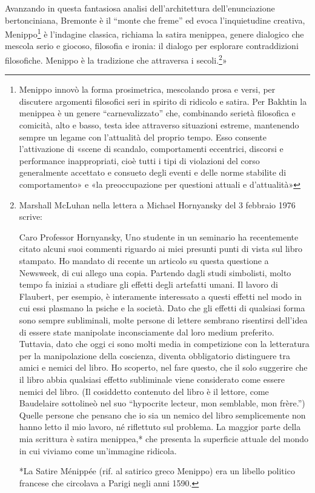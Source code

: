 Avanzando in questa fantasiosa analisi dell'architettura dell'enunciazione
bertonciniana, Bremonte è il “monte che freme” ed evoca l'inquietudine creativa,
Menippo\footnote{%
  Menippo innovò la forma prosimetrica, mescolando prosa e versi,
  per discutere argomenti filosofici seri in spirito di ridicolo e satira. Per
  Bakhtin la menippea è un genere “carnevalizzato” che, combinando serietà
  filosofica e comicità, alto e basso, testa idee attraverso situazioni
  estreme, mantenendo sempre un legame con l'attualità del proprio tempo. Esso
  consente l'attivazione di «scene di scandalo, comportamenti eccentrici,
  discorsi e performance inappropriati, cioè tutti i tipi di violazioni del
  corso generalmente accettato e consueto degli eventi e delle norme stabilite
  di comportamento» e «la preoccupazione per questioni attuali e d'attualità»\cite{bakhtin84}\cite{bakhtin84}
}%
è l'indagine classica, richiama la satira menippea, genere dialogico che mescola
serio e giocoso, filosofia e ironia: il dialogo per esplorare contraddizioni
filosofiche. Menippo è la tradizione che attraversa i secoli.\footnote{%
  Marshall McLuhan nella lettera a Michael Hornyansky del  3 febbraio 1976 scrive:

  Caro Professor Hornyansky,
  Uno studente in un seminario ha recentemente citato alcuni suoi commenti
  riguardo ai miei presunti punti di vista sul libro stampato. Ho mandato di
  recente un articolo su questa questione a Newsweek, di cui allego una copia.
  Partendo dagli studi simbolisti, molto tempo fa iniziai a studiare gli effetti
  degli artefatti umani. Il lavoro di Flaubert, per esempio, è interamente
  interessato a questi effetti nel modo in cui essi plasmano la psiche e la
  società. Dato che gli effetti di qualsiasi forma sono sempre subliminali,
  molte persone di lettere sembrano risentirsi dell'idea di essere state
  manipolate inconsciamente dal loro medium preferito. Tuttavia, dato che oggi
  ci sono molti media in competizione con la letteratura per la manipolazione
  della coscienza, diventa obbligatorio distinguere tra amici e nemici del
  libro. Ho scoperto, nel fare questo, che il solo suggerire che il libro abbia
  qualsiasi effetto subliminale viene considerato come essere nemici del libro.
  (Il cosiddetto contenuto del libro è il lettore, come Baudelaire sottolineò
  nel suo “hypocrite lecteur, mon semblable, mon frère.”) Quelle persone che
  pensano che io sia un nemico del libro semplicemente non hanno letto il mio
  lavoro, né riflettuto sul problema. La maggior parte della mia scrittura è
  satira menippea,* che presenta la superficie attuale del mondo in cui viviamo
  come un'immagine ridicola.

  *La Satire Ménippée (rif. al satirico greco Menippo) era un libello politico
  francese che circolava a Parigi negli anni 1590.
}» \cite{mcluhan87}

